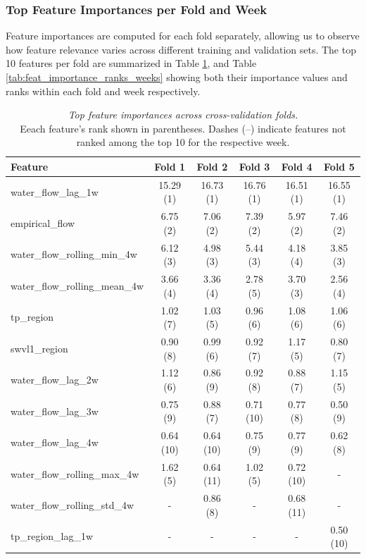 \documentclass[ruler]{CUP-JNL-EDS}%
\begin{document}
\subsubsection*{Top Feature Importances per Fold and Week}
Feature importances are computed for each fold separately, allowing us to observe how feature relevance varies 
across different training and validation sets. The top 10 features per fold are summarized in Table 
\ref{tab:feat_importance_ranks_folds}, and Table \ref{tab:feat_importance_ranks_weeks} showing both their 
importance values and ranks within each fold and week respectively.
\begin{table}[!htp]
\centering
\small
\begin{tabular}{lccccc}
\hline
\textbf{Feature} & \textbf{Fold 1} & \textbf{Fold 2} & \textbf{Fold 3} & \textbf{Fold 4} & \textbf{Fold 5} \\
\hline
water\_flow\_lag\_1w           & 15.29 (1) & 16.73 (1) & 16.76 (1) & 16.51 (1) & 16.55 (1) \\
empirical\_flow               & 6.75 (2)  & 7.06 (2)  & 7.39 (2)  & 5.97 (2)  & 7.46 (2) \\
water\_flow\_rolling\_min\_4w & 6.12 (3)  & 4.98 (3)  & 5.44 (3)  & 4.18 (4)  & 3.85 (3) \\
water\_flow\_rolling\_mean\_4w & 3.66 (4)  & 3.36 (4)  & 2.78 (5)  & 3.70 (3)  & 2.56 (4) \\
tp\_region                   & 1.02 (7)  & 1.03 (5)  & 0.96 (6)  & 1.08 (6)  & 1.06 (6) \\
swvl1\_region                & 0.90 (8)  & 0.99 (6)  & 0.92 (7)  & 1.17 (5)  & 0.80 (7) \\
water\_flow\_lag\_2w           & 1.12 (6)  & 0.86 (9)  & 0.92 (8)  & 0.88 (7)  & 1.15 (5) \\
water\_flow\_lag\_3w           & 0.75 (9)  & 0.88 (7)  & 0.71 (10) & 0.77 (8)  & 0.50 (9) \\
water\_flow\_lag\_4w           & 0.64 (10) & 0.64 (10) & 0.75 (9)  & 0.77 (9)  & 0.62 (8) \\
water\_flow\_rolling\_max\_4w & 1.62 (5)  & 0.64 (11) & 1.02 (5)  & 0.72 (10) & -         \\
water\_flow\_rolling\_std\_4w & -         & 0.86 (8)  & -         & 0.68 (11) & -         \\
tp\_region\_lag\_1w           & -         & -         & -         & -         & 0.50 (10) \\
\hline
\end{tabular}
\caption{\textit{Top feature importances across cross-validation folds.}\\
Eeach feature’s rank shown in parentheses. Dashes (–) indicate features not ranked among the top 10 for the respective week.}
\label{tab:feat_importance_ranks_folds}
\end{table}
\end{document}
